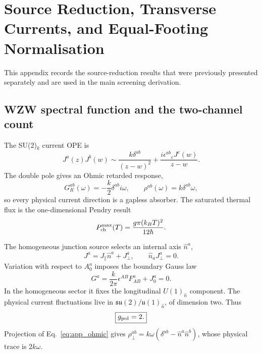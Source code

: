 \documentclass[aps,prd,twocolumn,10pt,superscriptaddress,nofootinbib]{revtex4-2}
\begin{document}


\section{Source Reduction, Transverse Currents, and Equal-Footing Normalisation}
\label{app:source_reduction}

This appendix records the source-reduction results that were previously
presented separately and are used in the main screening derivation.

\subsection{WZW spectral function and the two-channel count}

The SU(2)$_k$ current OPE is
\begin{equation}
J^a(z)J^b(w)\sim\frac{k\delta^{ab}}{(z-w)^2}
+\frac{i\epsilon^{ab}{}_{c}J^c(w)}{z-w}.
\label{eq:app_current_ope}
\end{equation}
The double pole gives an Ohmic retarded response,
\begin{equation}
G_R^{ab}(\omega)=-\frac{k}{2}\delta^{ab}i\omega,
\qquad
\rho^{ab}(\omega)=k\delta^{ab}\omega,
\label{eq:app_ohmic}
\end{equation}
so every physical current direction is a gapless absorber.  The saturated
thermal flux is the one-dimensional Pendry result
\begin{equation}
P_{\rm ch}^{\rm max}(T)
=\frac{g\pi(k_BT)^2}{12\hbar}.
\label{eq:app_pendry}
\end{equation}

The homogeneous junction source selects an internal axis $\hat n^a$,
\begin{equation}
J^a=J_\parallel\hat n^a+J_\perp^a,
\qquad \hat n_aJ_\perp^a=0.
\end{equation}
Variation with respect to $A_0^a$ imposes the boundary Gauss law
\begin{equation}
G^a=\frac{k}{2\pi}\epsilon^{AB}F^a_{AB}+J_0^a=0.
\label{eq:app_gauss}
\end{equation}
In the homogeneous sector it fixes the longitudinal
$U(1)_{\hat n}$ component.  The physical current fluctuations live in
$\mathfrak{su}(2)/\mathfrak{u}(1)_{\hat n}$, of dimension two.  Thus
\begin{equation}
\boxed{g_{\rm pol}=2.}
\end{equation}
Projection of Eq.~\eqref{eq:app_ohmic} gives
$\rho_\perp^{ab}=k\omega(\delta^{ab}-\hat n^a\hat n^b)$, whose physical
trace is $2k\omega$.
\end{document}
